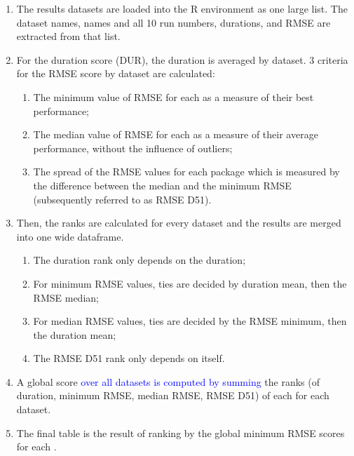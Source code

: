 \begin{enumerate}
\def\labelenumi{\arabic{enumi}.}
\tightlist
\item
  The results datasets are loaded into the \textsf{R} environment as one
  large list. The dataset names,  names and all
  10 run numbers, durations, and RMSE are extracted from that list.
\item
  For the duration score (DUR), the duration is averaged by dataset. 3
  criteria for the RMSE score by dataset are calculated:

  \begin{enumerate}
  \def\labelenumii{\alph{enumii}.}
  \tightlist
  \item
    The minimum value of RMSE for each  as a
    measure of their best performance;
  \item
    The median value of RMSE for each  as a
    measure of their average performance, without the influence of
    outliers;
  \item
    The spread of the RMSE values for each package which is measured by
    the difference between the median and the minimum RMSE (subsequently
    referred to as RMSE D51).
  \end{enumerate}
\item
  Then, the ranks are calculated for every dataset and the results are
  merged into one wide dataframe.

  \begin{enumerate}
  \def\labelenumii{\alph{enumii}.}
  \tightlist
  \item
    The duration rank only depends on the duration;
  \item
    For minimum RMSE values, ties are decided by duration mean, then the
    RMSE median;
  \item
    For median RMSE values, ties are decided by the RMSE minimum, then
    the duration mean;
  \item
    The RMSE D51 rank only depends on itself.
  \end{enumerate}
\item
  A global score
  \textcolor{blue}{over all datasets is computed by summing} the ranks
  (of duration, minimum RMSE, median RMSE, RMSE D51) of each
   for each dataset.
\item
  The final table is the result of ranking by the global minimum RMSE
  scores for each .
\end{enumerate}

